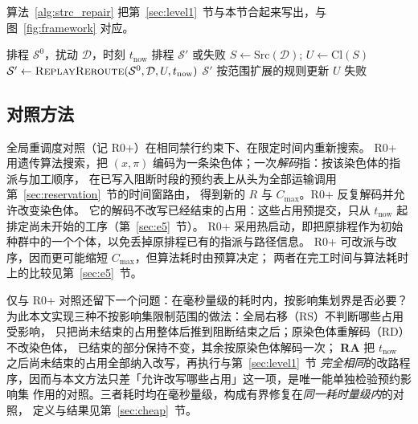 \documentclass[manuscript,screen,review]{acmart}
\begin{document}
算法~\ref{alg:strc_repair} 把第~\ref{sec:level1}~节与本节合起来写出，与图~\ref{fig:framework} 对应。

\begin{algorithm}[t]
\caption{基于预约影响集的有界修复（单遍改路 + 范围扩展）}
\label{alg:strc_repair}
\begin{algorithmic}[1]
\Require 排程 \(\mathcal{S}^0\)，扰动 \(\mathcal{D}\)，时刻 \(t_{\mathrm{now}}\)
\Ensure 排程 \(\mathcal{S}'\) 或失败
\State \(S \gets \mathrm{Src}(\mathcal{D})\);
      \(U \gets \mathrm{Cl}(S)\)
  \State \(\mathcal{S}' \gets \textsc{ReplayReroute}(\mathcal{S}^0,\mathcal{D},U,t_{\mathrm{now}})\)
    \State \Return \(\mathcal{S}'\)
  \EndIf
  \State 按范围扩展的规则更新 \(U\) 
\EndFor
\State \Return 失败
\end{algorithmic}
\end{algorithm}

\subsection{对照方法}
\label{sec:vs_r0}

全局重调度对照（记 R0+）在相同禁行约束下、在限定时间内重新搜索。
R0+ 用遗传算法搜索，把 \((x,\pi)\) 编码为一条染色体；一次\emph{解码}指：按该染色体的指派与加工顺序，
在已写入阻断时段的预约表上从头为全部运输调用第~\ref{sec:reservation}~节的时间窗路由，
得到新的 \(R\) 与 \(C_{\max}\)。R0+ 反复解码并允许改变染色体。
它的解码不改写已经结束的占用：这些占用预提交，只从 \(t_{\mathrm{now}}\) 起排定尚未开始的工序（第~\ref{sec:e5}~节）。
R0+ 采用热启动，即把原排程作为初始种群中的一个个体，以免丢掉原排程已有的指派与路径信息。
R0+ 可改派与改序，因而更可能缩短 \(C_{\max}\)，但算法耗时由预算决定；
两者在完工时间与算法耗时上的比较见第~\ref{sec:e5}~节。

仅与 R0+ 对照还留下一个问题：在毫秒量级的耗时内，按影响集划界是否必要？
为此本文实现三种不按影响集限制范围的做法：全局右移（RS）不判断哪些占用受影响，
只把尚未结束的占用整体后推到阻断结束之后；原染色体重解码（RD）不改染色体，
已结束的部分保持不变，其余按原染色体解码一次；
\textbf{RA} 把 \(t_{\mathrm{now}}\) 之后尚未结束的占用全部纳入改写，再执行与第~\ref{sec:level1}~节
\emph{完全相同}的改路程序，因而与本文方法只差「允许改写哪些占用」这一项，是唯一能单独检验预约影响集
作用的对照。三者耗时均在毫秒量级，构成有界修复在\emph{同一耗时量级内}的对照，
定义与结果见第~\ref{sec:cheap}~节。

\end{document}
